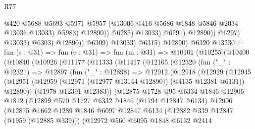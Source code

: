 \begin{lexlean}{R77}
\begin{coremodule}
                                      @420
                                      @5688
                                      @5693
                                      @5971
                                      @5957
                                      (@13006 @416 @5686 @1848 @5846 @2034 @13036 @13033)
                                      @5983)
                                    @12890))
                                @6285)
                              @13033)
                            @6291)
                          @12890))
                      @6297)
                    @13033)
                  @6303)
                @12890))
            @6309)
          @13033)
        @6315)
      @12890)
    @6320
@13230 := fun (s : @31) =>
  fun (e : @31) =>
  fun (m : @31) =>
  @10101
    (@10255
      (@10400
        (@10840
          (@10926
            (@11177
              (@11333
                (@11417
                  (@12165
                    (@12320
                      (fun ("_" : @12321) =>
                      @12897
                        (fun ("_" : @12898) =>
                        @12912
                          (@12918
                            (@12929
                              (@12945
                                (@12951
                                  (@12959 (@12971 (@12977 @13144 @12890)) (@4135 @12381 @6131))
                                  @12890))
                              (@1978 @12391 @12383))
                            (@12875
                              @1728
                              @95
                              @6334
                              @1846
                              @12906
                              @1812
                              (@12899
                                @570
                                @1727
                                @6332
                                @1846
                                (@1794 @12847 @6134)
                                @12906
                                (@12875
                                  @1662
                                  @1289
                                  @1846
                                  @6097
                                  @12847
                                  @6134
                                  (@12882 @339 @12847 (@1959 (@12885 @339)))
                                  (@12972
                                    @560
                                    @6095
                                    @1848
                                    @6132
                                    @2414

\end{coremodule}
\end{lexlean}
